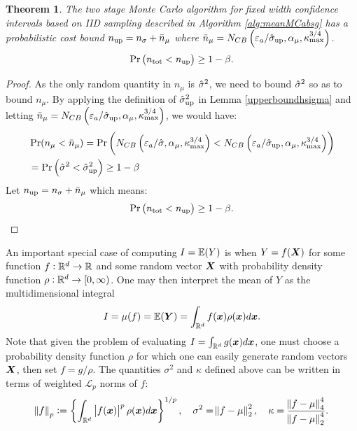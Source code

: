 \documentclass{iitthesis}
\newtheorem{theorem}{Theorem}[section]
\begin{document}
\begin{theorem}
The two stage Monte Carlo algorithm for fixed width confidence intervals based on IID sampling described in Algorithm \ref{alg:meanMCabsg} has a probabilistic cost bound $n_{\operatorname{up}} =n_\sigma+\bar{n}_{\mu}$ where $\bar{n}_{\mu}=N_{CB}\left(\varepsilon_a/\hat{\sigma}_{\operatorname{up}},\alpha_\mu, \kappa_{\max}^{3/4}\right)$.
\begin{align}
\Pr \left(n_{\operatorname{tot}} < n_{\operatorname{up}}\right)  \geq 1-\beta.
\end{align}
\end{theorem}

\begin{proof}
As the only random quantity in $n_\mu$ is $\hat{\sigma}^2$, we need to bound $\hat{\sigma}^2$ so as  to bound $n_{\mu}$.
 By applying the definition of $\hat{\sigma}_{\operatorname{up}}^2$ in Lemma \ref{upperboundhsigma} and letting $\bar{n}_{\mu} = N_{CB}\left(\varepsilon_a/\hat{\sigma}_{\operatorname{up}},\alpha_\mu, \kappa_{\max}^{3/4}\right)$, we would have:
\begin{align}
& \Pr(n_{\mu} < \bar{n}_{\mu})  = \Pr\left (N_{CB}\left(\varepsilon_a/\hat{\sigma},\alpha_\mu, \kappa_{\max}^{3/4}\right) < N_{CB}\left(\varepsilon_a/\hat{\sigma}_{\operatorname{up}},\alpha_\mu, \kappa_{\max}^{3/4}\right) \right)\\&
 = \Pr \left(\hat{\sigma}^2 < \hat{\sigma}_{\operatorname{up}}^2 \right) \geq 1-\beta
\end{align}
Let $n_{\operatorname{up}} =n_\sigma+\bar{n}_{\mu} $
which means:
\begin{align}
\Pr \left(n_{\operatorname{tot}} < n_{\operatorname{up}}\right)  \geq 1-\beta.
\end{align}
\end{proof}
\label{sec:numericalintegrationviaMC}
An important special case of computing $I =\mathbb{E}(Y)$ is when $Y = f(\boldsymbol{X})$ for some function $f:\mathbb{R}^d \to \mathbb{R}$ and some random vector $\boldsymbol{X}$ with probability density function $\rho: \mathbb{R}^d \to [0,\infty)$. One may then interpret the mean of $Y$ as the multidimensional integral
\begin{align*}
I= \mu(f) = \mathbb{E}(\boldsymbol{Y}) = \int_{\mathbb{R}^d}f(\boldsymbol{x})\rho(\boldsymbol{x})d\boldsymbol{x}.
\end{align*}
Note that given the problem of evaluating $I = \int_{\mathbb{R}^d}g(\boldsymbol{x})d\boldsymbol{x}$, one must choose a probability density function $\rho$ for which one can easily generate random vectors $\boldsymbol{X}$, then set $f = g/\rho$. The quantities $\sigma^2$ and $\kappa$ defined above can be written in terms of weighted $\mathcal{L}_p$ norms of $f$:
\begin{align}
\norm{f}_p:=\left\{ \int_{\mathbb{R}^d}\left \lvert f(\boldsymbol{x}) \right \rvert^p\rho(\boldsymbol{x})d\boldsymbol{x}\right\}^{1/p}, \quad \sigma^2 = \norm{f-\mu}_2^2,\quad \kappa = \frac{\norm{f-\mu}_4^4}{\norm{f-\mu}_2^4}.
\end{align}
\end{document}
